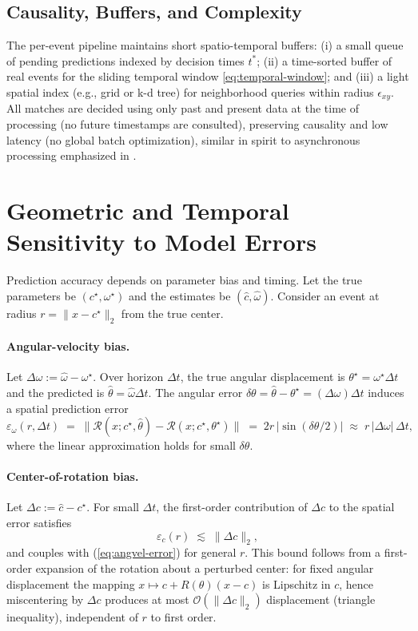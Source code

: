 \subsection{Causality, Buffers, and Complexity}
The per-event pipeline maintains short spatio-temporal buffers: (i) a small queue of pending predictions indexed by decision times $t^*$; (ii) a time-sorted buffer of real events for the sliding temporal window \eqref{eq:temporal-window}; and (iii) a light spatial index (e.g., grid or k-d tree) for neighborhood queries within radius $\epsilon_{xy}$. All matches are decided using only past and present data at the time of processing (no future timestamps are consulted), preserving causality and low latency (no global batch optimization), similar in spirit to asynchronous processing emphasized in \cite{Wang2025Thesis,Scheerlinck2021Thesis}.

\section{Geometric and Temporal Sensitivity to Model Errors}
Prediction accuracy depends on parameter bias and timing. Let the true parameters be $(c^\star,\omega^\star)$ and the estimates be $(\hat c,\hat\omega)$. Consider an event at radius $r=\|x-c^\star\|_2$ from the true center.

\paragraph{Angular-velocity bias.}
Let $\Delta\omega := \hat\omega-\omega^\star$. Over horizon $\Delta t$, the true angular displacement is $\theta^\star=\omega^\star \Delta t$ and the predicted is $\hat\theta=\hat\omega \Delta t$. The angular error $\delta\theta=\hat\theta-\theta^\star=(\Delta\omega)\Delta t$ induces a spatial prediction error
\begin{equation}
\varepsilon_{\omega}(r,\Delta t) \;=\; \big\|\mathcal{R}(x;c^\star,\hat\theta)-\mathcal{R}(x;c^\star,\theta^\star)\big\|
\;=\; 2r\,\big|\sin(\delta\theta/2)\big|
\;\approx\; r\,|\Delta\omega|\,\Delta t,
\label{eq:angvel-error}
\end{equation}
where the linear approximation holds for small $\delta\theta$.

\paragraph{Center-of-rotation bias.}
Let $\Delta c := \hat c - c^\star$. For small $\Delta t$, the first-order contribution of $\Delta c$ to the spatial error satisfies
\begin{equation}
\varepsilon_{c}(r) \;\lesssim\; \|\Delta c\|_2,
\label{eq:center-error}
\end{equation}
and couples with (\ref{eq:angvel-error}) for general $r$. This bound follows from a first-order expansion of the rotation about a perturbed center: for fixed angular displacement the mapping $x\mapsto c+R(\theta)(x-c)$ is Lipschitz in $c$, hence miscentering by $\Delta c$ produces at most $\mathcal O(\|\Delta c\|_2)$ displacement (triangle inequality), independent of $r$ to first order.

